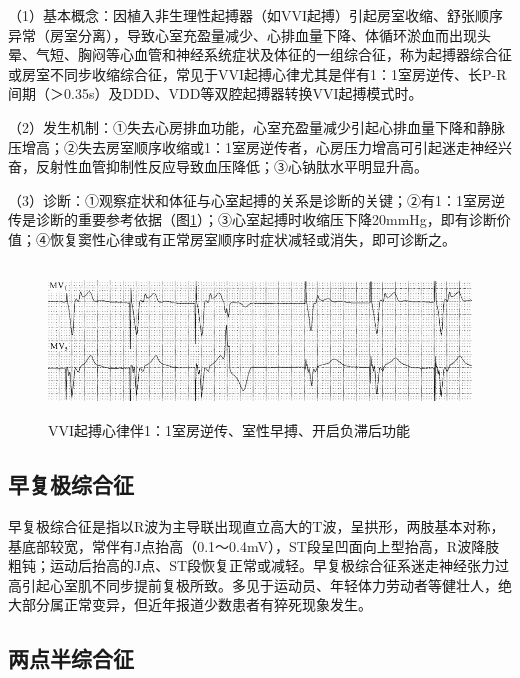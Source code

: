 （1）基本概念：因植入非生理性起搏器（如VVI起搏）引起房室收缩、舒张顺序异常（房室分离），导致心室充盈量减少、心排血量下降、体循环淤血而出现头晕、气短、胸闷等心血管和神经系统症状及体征的一组综合征，称为起搏器综合征或房室不同步收缩综合征，常见于VVI起搏心律尤其是伴有1：1室房逆传、长P-R间期（＞0.35s）及DDD、VDD等双腔起搏器转换VVI起搏模式时。

（2）发生机制：①失去心房排血功能，心室充盈量减少引起心排血量下降和静脉压增高；②失去房室顺序收缩或1：1室房逆传者，心房压力增高可引起迷走神经兴奋，反射性血管抑制性反应导致血压降低；③心钠肽水平明显升高。

（3）诊断：①观察症状和体征与心室起搏的关系是诊断的关键；②有1：1室房逆传是诊断的重要参考依据（图\ref{fig40-13}）；③心室起搏时收缩压下降20mmHg，即有诊断价值；④恢复窦性心律或有正常房室顺序时症状减轻或消失，即可诊断之。

\begin{figure}[!htbp]
 \centering
 \includegraphics[width=5.58333in,height=1.59375in]{./images/Image00675.jpg}
 \captionsetup{justification=centering}
 \caption{VVI起搏心律伴1：1室房逆传、室性早搏、开启负滞后功能}
 \label{fig40-13}
  \end{figure} 

\protect\hypertarget{text00047.htmlux5cux23subid561}{}{}

\subsection{早复极综合征}

早复极综合征是指以R波为主导联出现直立高大的T波，呈拱形，两肢基本对称，基底部较宽，常伴有J点抬高（0.1～0.4mV），ST段呈凹面向上型抬高，R波降肢粗钝；运动后抬高的J点、ST段恢复正常或减轻。早复极综合征系迷走神经张力过高引起心室肌不同步提前复极所致。多见于运动员、年轻体力劳动者等健壮人，绝大部分属正常变异，但近年报道少数患者有猝死现象发生。

\protect\hypertarget{text00047.htmlux5cux23subid562}{}{}

\subsection{两点半综合征}

